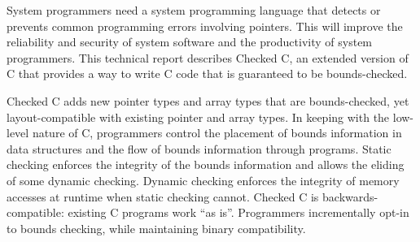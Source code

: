 
\parbox{5in}{
System programmers need a system programming language that
detects or prevents common programming errors involving pointers. This
will improve the reliability and security of system software and
the productivity of system programmers. This technical report describes
Checked C, an extended version of C that provides a way to write C code that
is guaranteed to be bounds-checked.
}
\vspace{11pt}

\parbox{5in}{
Checked C adds new pointer types and array types that are
bounds-checked, yet layout-compatible with existing pointer and array
types. In keeping with the low-level nature of C, 
programmers control the placement of bounds information in data
structures and the flow of bounds information through programs. Static
checking enforces the integrity of the bounds information and allows the
eliding of some dynamic checking. Dynamic checking enforces the
integrity of memory accesses at runtime when static checking cannot.
Checked C is backwards-compatible: existing C programs work
``as is''. Programmers incrementally opt-in to bounds checking, while
maintaining binary compatibility.}


